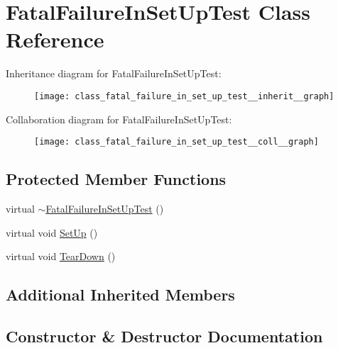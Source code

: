 \hypertarget{class_fatal_failure_in_set_up_test}{}\section{Fatal\+Failure\+In\+Set\+Up\+Test Class Reference}
\label{class_fatal_failure_in_set_up_test}


Inheritance diagram for Fatal\+Failure\+In\+Set\+Up\+Test\+:
\nopagebreak
\begin{figure}[H]
\begin{center}
\leavevmode
\texttt{[image: class\_fatal\_failure\_in\_set\_up\_test\_\_inherit\_\_graph]}
\end{center}
\end{figure}


Collaboration diagram for Fatal\+Failure\+In\+Set\+Up\+Test\+:
\nopagebreak
\begin{figure}[H]
\begin{center}
\leavevmode
\texttt{[image: class\_fatal\_failure\_in\_set\_up\_test\_\_coll\_\_graph]}
\end{center}
\end{figure}
\subsection*{Protected Member Functions}
\begin{DoxyCompactItemize}
\item 
virtual \hyperlink{class_fatal_failure_in_set_up_test_a915ca362b046259c3586c1ab72bb0a93}{$\sim$\+Fatal\+Failure\+In\+Set\+Up\+Test} ()
\item 
virtual void \hyperlink{class_fatal_failure_in_set_up_test_a455696f86fb5f5393624221ccb79b373}{Set\+Up} ()
\item 
virtual void \hyperlink{class_fatal_failure_in_set_up_test_a457707161063e08f7b6600ec5db449e4}{Tear\+Down} ()
\end{DoxyCompactItemize}
\subsection*{Additional Inherited Members}


\subsection{Constructor \& Destructor Documentation}
